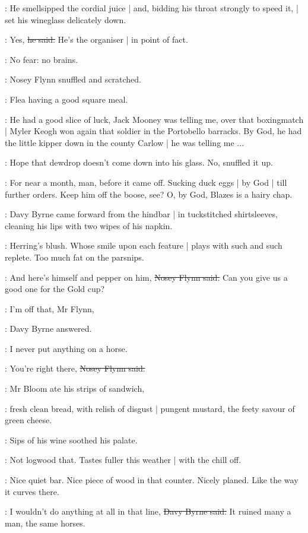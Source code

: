 :
He smellsipped the cordial juice |
and, bidding his throat strongly to speed it, |
set his wineglass delicately down.

\Bloom:
Yes,
\sout{he said.}
He's the organiser |
in point of fact.

\BloomInt:
No fear:
no brains.

:
Nosey Flynn snuffled and scratched.

\BloomInt:
Flea having a good square meal.

\nosey:
He had a good slice of luck,
Jack Mooney was telling me,
over that boxingmatch |
Myler Keogh won again that soldier in the Portobello barracks.
By God,
he had the little kipper down in the county Carlow |
he was telling me ...

\BloomInt:
Hope that dewdrop doesn't come down into his glass.
No, snuffled it up.

\nosey:
For near a month, man,
before it came off.
Sucking duck eggs |
by God |
till further orders.
Keep him off the boose, see?
O, by God,
Blazes is a hairy chap.

:
Davy Byrne came forward from the hindbar |
in tuckstitched shirtsleeves,
cleaning his lips with two wipes of his napkin.

\BloomInt:
Herring's blush.
Whose smile upon each feature |
plays with such and such replete.
Too much fat on the parsnips.

\nosey:
And here's himself and pepper on him,
\sout{Nosey Flynn said.}
Can you give us a good one for the Gold cup?

\davybyrne:
I'm off that, Mr Flynn,

:
Davy Byrne answered.

\davybyrne:
I never put anything on a horse.

\nosey:
You're right there,
\sout{Nosey Flynn said.}

:
Mr Bloom ate his strips of sandwich,

\BloomInt:
fresh clean bread,
with relish of disgust |
pungent mustard,
the feety savour of green cheese.

:
Sips of his wine soothed his palate.

\BloomInt:
Not logwood that.
Tastes fuller this weather |
with the chill off.

\BloomInt:
Nice quiet bar.
Nice piece of wood in that counter.
Nicely planed.
Like the way it curves there.

\davybyrne:
I wouldn't do anything at all in that line,
\sout{Davy Byrne said.}
It ruined many a man,
the same horses.

